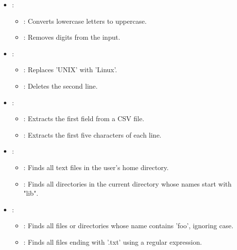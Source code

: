 \begin{exampleblock}
    
    \begin{itemize}
        \item {}:
        \begin{itemize}
            \item {}: Converts lowercase letters to uppercase.
            \item {}: Removes digits from the input.
        \end{itemize}
        \item {}:
        \begin{itemize}
            \item {}: Replaces 'UNIX' with 'Linux'.
            \item {}: Deletes the second line.
        \end{itemize}
        \item {}:
        \begin{itemize}
            \item {}: Extracts the first field from a CSV file.
            \item {}: Extracts the first five characters of each line.
        \end{itemize}
        \item {}:
        \begin{itemize}
            \item {}: Finds all text files in the user's home directory.
            \item {}: Finds all directories in the current directory whose names start with "lib".
        \end{itemize}
        \item {}:
        \begin{itemize}
            \item {}: Finds all files or directories whose name contains 'foo', ignoring case.
            \item {}: Finds all files ending with '.txt' using a regular expression.
        \end{itemize}
    \end{itemize}
    
\end{exampleblock}
    






